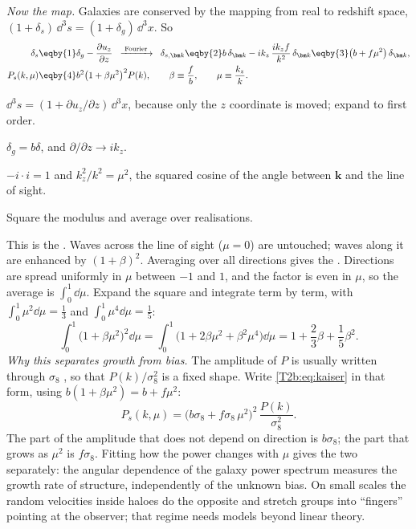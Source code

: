 \emph{Now the map.} Galaxies are conserved by the mapping from real to redshift space, $(1+\delta_s)\,\dd^3s=(1+\delta_g)\,\dd^3x$. So
\begin{align}
  \delta_s
  &\eqby{1}\delta_g-\frac{\partial u_z}{\partial z}
  \;\;\xrightarrow{\;\text{Fourier}\;}\;\;
  \delta_{s,\bm k}\eqby{2}b\,\delta_{\bm k}-ik_z\,\frac{ik_zf}{k^2}\,\delta_{\bm k}
  \eqby{3}\big(b+f\mu^2\big)\,\delta_{\bm k},\nonumber\\
  P_s(k,\mu)
  &\eqby{4}b^2\big(1+\beta\mu^2\big)^2P(k),\qquad\beta\equiv\frac fb,\qquad\mu\equiv\frac{k_z}{k}.
  \label{T2b:eq:kaiser}
\end{align}
\begin{explain}
  \item $\dd^3s=(1+\partial u_z/\partial z)\,\dd^3x$, because only the $z$ coordinate is moved; expand to first order.
  \item $\delta_g=b\delta$, and $\partial/\partial z\to ik_z$.
  \item $-i\cdot i=1$ and $k_z^2/k^2=\mu^2$, the squared cosine of the angle between $\bm k$ and the line of sight.
  \item Square the modulus and average over realisations.
\end{explain}
This is the  \cite{Kaiser1987}. Waves across the line of sight ($\mu=0$) are untouched; waves along it are enhanced by $(1+\beta)^2$. Averaging over all directions gives the . Directions are spread uniformly in $\mu$ between $-1$ and $1$, and the factor is even in $\mu$, so the average is $\int_0^1\dd\mu$. Expand the square and integrate term by term, with $\int_0^1\mu^2\dd\mu=\frac13$ and $\int_0^1\mu^4\dd\mu=\frac15$:
\[
  \int_0^1\big(1+\beta\mu^2\big)^2\dd\mu=\int_0^1\big(1+2\beta\mu^2+\beta^2\mu^4\big)\dd\mu=1+\frac23\beta+\frac15\beta^2 .
\]
\emph{Why this separates growth from bias.} The amplitude of $P$ is usually written through $\sigma_8$ , so that $P(k)/\sigma_8^2$ is a fixed shape. Write \eqref{T2b:eq:kaiser} in that form, using $b(1+\beta\mu^2)=b+f\mu^2$:
\[
  P_s(k,\mu)=\big(b\sigma_8+f\sigma_8\,\mu^2\big)^2\,\frac{P(k)}{\sigma_8^2}.
\]
The part of the amplitude that does not depend on direction is $b\sigma_8$; the part that grows as $\mu^2$ is $f\sigma_8$. Fitting how the power changes with $\mu$ gives the two separately: the angular dependence of the galaxy power spectrum measures the growth rate of structure, independently of the unknown bias. On small scales the random velocities inside haloes do the opposite and stretch groups into ``fingers'' pointing at the observer; that regime needs models beyond linear theory.


